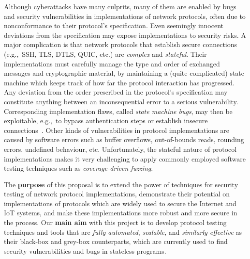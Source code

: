 \documentclass[11pt]{article}
\newcommand{\eg}{e.\/g.,\ }
\begin{document}
Although cyberattacks have many culprits, many of them are enabled by bugs and
security vulnerabilities in implementations of network protocols, often due to
nonconformance to their protocol's specification. Even seemingly innocent
deviations from the specification may expose implementations to security
risks. A major complication is that network protocols that establish secure
connections (\eg SSH, TLS, DTLS, QUIC, etc.) are \emph{complex} and
\emph{stateful}. Their implementations must carefully manage the type and
order of exchanged messages and cryptographic material, by maintaining a
(quite complicated) state machine which keeps track of how far the protocol
interaction has progressed. Any deviation from the order prescribed in the
protocol's specification may constitute anything between an inconsequential
error to a serious vulnerability. Corresponding implementation flaws, called
\emph{state machine bugs}, may then be exploitable, \eg to bypass
authentication steps or establish insecure
connections~\cite{MessyTLS@CACM-17,ruiter2015,somorovsky2016,DTLS@USENIX-20}.
Other kinds of vulnerabilities in protocol implementations are caused by
software errors such as buffer overflows, out-of-bounds reads, rounding
errors, undefined behaviour, etc. Unfortunately, the stateful nature of
protocol implementations makes it very challenging to apply commonly employed
software testing techniques such as \emph{coverage-driven fuzzing}.

The \textbf{purpose} of this proposal is to extend the power of techniques for
security testing of network protocol implementations, demonstrate their
potential on implementations of protocols which are widely used to secure the
Internet and IoT systems, and make these implementations more robust and more
secure in the process.
%
Our \textbf{main aim} with this project is to develop protocol testing
techniques and tools that are \emph{fully automated}, \emph{scalable}, and
\emph{similarly effective} as their black-box and grey-box counterparts,
which are currently used to find security vulnerabilities and bugs in stateless
programs.
\end{document}
